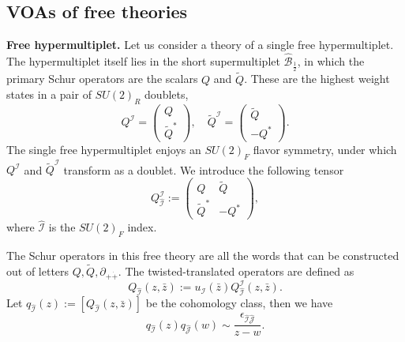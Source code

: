 \documentclass[a4paper,11pt]{article}
\begin{document}
\subsection{VOAs of free theories}
\textbf{Free hypermultiplet.}
Let us consider a theory of a single free hypermultiplet. The hypermultiplet itself lies in the short supermultiplet $\hat{\mathcal{B}}_{\frac{1}{2}}$, in which the primary Schur operators are the scalars $Q$ and $\widetilde{Q}$. These are the highest weight states in a pair of $SU(2)_R$ doublets,
\begin{equation}
    Q^\mathcal{I} = \begin{pmatrix}
        Q\\ \widetilde{Q}^*
    \end{pmatrix}, \quad \widetilde{Q}^\mathcal{I} = \begin{pmatrix}
        \widetilde{Q}\\ - Q^*
    \end{pmatrix}.
\end{equation}
The single free hypermultiplet enjoys an $SU(2)_F$ flavor symmetry, under which $Q^\mathcal{I}$ and $\widetilde{Q}^\mathcal{I}$ transform as a doublet. We introduce the following tensor
\begin{equation}
    Q^\mathcal{I}_{\hat{\mathcal{I}}} := \begin{pmatrix}
        Q & \widetilde{Q}\\
        \widetilde{Q}^* & - Q^*
    \end{pmatrix},
\end{equation}
where $\hat{\mathcal{I}}$ is the $SU(2)_F$ index.

The Schur operators in this free theory are all the words that can be constructed out of letters $Q, \widetilde{Q}, \partial_{+\dot{+}}$.
The twisted-translated operators are defined as
\begin{equation}
    Q_{\hat{\mathcal{I}}} (z, \bar{z}) := u_\mathcal{I}(\bar{z}) Q^\mathcal{I}_{\hat{\mathcal{I}}}(z, \bar{z}).
\end{equation}
Let $q_{\hat{\mathcal{I}}} (z) := [Q_{\hat{\mathcal{I}}}(z, \bar{z})]$ be the cohomology class, then we have
\begin{equation}
    q_{\hat{\mathcal{I}}}(z) q_{\hat{\mathcal{J}}}(w) \sim \frac{\epsilon_{\hat{\mathcal{I}} \hat{\mathcal{J}}}}{z-w}.
\end{equation}
\end{document}
